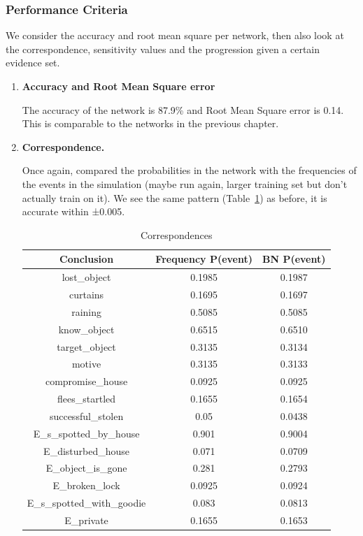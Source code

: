 \subsubsection{Performance Criteria}
We consider the accuracy and root mean square per network, then also look at the correspondence, sensitivity values and the progression given a certain evidence set.
\begin{enumerate}
\item \textbf{Accuracy and Root Mean Square error}

The accuracy of the network is 87.9\% and Root Mean Square error is 0.14. This is comparable to the networks in the previous chapter.

\item \textbf{Correspondence.}

Once again, compared the probabilities in the network with the frequencies of the events in the simulation (maybe run again, larger training set but don't actually train on it). We see the same pattern (Table~\ref{testCorSimple}) as before, it is accurate within ±0.005. 

\begin{table}
\centering
\begin{tabular}{|c|c|c|}
 \hline
 Conclusion & Frequency P(event) & BN P(event)\\
 \hline
lost\_object   & 0.1985 & 0.1987\\
curtains & 0.1695 &  0.1697\\
raining & 0.5085 &  0.5085\\
know\_object & 0.6515 &  0.6510\\
target\_object & 0.3135 & 0.3134\\
motive & 0.3135 & 0.3133\\
compromise\_house & 0.0925 & 0.0925 \\
flees\_startled & 0.1655 &  0.1654\\
successful\_stolen & 0.05 & 0.0438\\ 
E\_s\_spotted\_by\_house&  0.901 & 0.9004 \\ 
E\_disturbed\_house& 0.071 &  0.0709\\ 
E\_object\_is\_gone&  0.281 &  0.2793\\ 
E\_broken\_lock&  0.0925 &  0.0924\\ 
E\_s\_spotted\_with\_goodie& 0.083  & 0.0813 \\ 
E\_private&  0.1655 & 0.1653\\ 
\hline
\end{tabular}
\caption{Correspondences}
\label{testCorSimple}


\end{table}
\end{enumerate}
